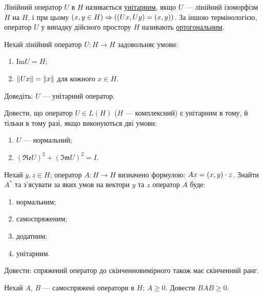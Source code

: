 \begin{theory}
    Лінійний оператор $U$ в $H$ називається \uline{унітарним}, якщо
    $U$ --- лінійний ізоморфізм $H$ на $H$, і при цьому $(x, y \in H) \Rightarrow 
    \left(\left(Ux, Uy\right) = \left(x, y\right)\right)$. За іншою термінологією, оператор
    $U$ у випадку дійсного простору $H$ називають \uline{ортогональним}.
\end{theory}

\begin{exercise}
    Нехай лінійний оператор $U:H \to H$ задовольняє умови:
    \begin{enumerate}[label=\ukr*)]
        \item $\mathrm{Im}U = H$;
        \item $\left\lVert Ux\right\rVert = \left\lVert x\right\rVert$ для кожного $x \in H$.
    \end{enumerate}
    Доведіть: $U$ --- унітарний оператор.
\end{exercise}

\begin{exercise}
    Довести, що оператор $U \in L(H)$ ($H$ --- комплексний) є унітарним в тому,
    й тільки в тому разі, якщо виконуються дві умови:
    \begin{enumerate}[label=\ukr*)]
        \item $U$ --- нормальний;
        \item $(\mathfrak{Re}U)^2 + (\mathfrak{Im}U)^2 = I$.
    \end{enumerate}
\end{exercise}

\begin{exercise}
    Нехай $y, z \in H$; оператор $A: H \to H$ визначено формулою: $Ax = \left(x, y\right) \cdot z$.
    Знайти $A^*$ та з'ясувати за яких умов на вектори $y$ та $z$ оператор $A$ буде:
    \begin{enumerate}[label=\ukr*)]
        \item нормальним;
        \item самоспряженим;
        \item додатним;
        \item унітарним.
    \end{enumerate}
\end{exercise}

\begin{exercise}\label{N:1_3_33}
    Довести: спряжений оператор до скінченновимірного також має скінченний ранг.
\end{exercise}

\begin{exercise}
    Нехай $A$, $B$ --- самоспряжені оператори в $H$; $A \geq 0$.
    Довести $BAB \geq 0$.
\end{exercise}